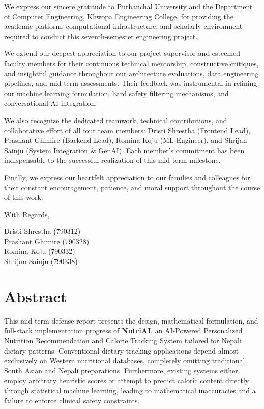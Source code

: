 \documentclass[12pt,a4paper]{report}
\begin{document}
We express our sincere gratitude to Purbanchal University and the Department of Computer Engineering, Khwopa Engineering College, for providing the academic platform, computational infrastructure, and scholarly environment required to conduct this seventh-semester engineering project.

We extend our deepest appreciation to our project supervisor and esteemed faculty members for their continuous technical mentorship, constructive critiques, and insightful guidance throughout our architecture evaluations, data engineering pipelines, and mid-term assessments. Their feedback was instrumental in refining our machine learning formulation, hard safety filtering mechanisms, and conversational AI integration.

We also recognize the dedicated teamwork, technical contributions, and collaborative effort of all four team members: Dristi Shrestha (Frontend Lead), Prashant Ghimire (Backend Lead), Romina Koju (ML Engineer), and Shrijan Sainju (System Integration \& GenAI). Each member's commitment has been indispensable to the successful realization of this mid-term milestone.

Finally, we express our heartfelt appreciation to our families and colleagues for their constant encouragement, patience, and moral support throughout the course of this work.

\vspace{0.8cm}
\noindent With Regards,

\vspace{0.5cm}
\noindent Dristi Shrestha \hfill (790312)\\[0.1cm]
\noindent Prashant Ghimire \hfill (790328)\\[0.1cm]
\noindent Romina Koju \hfill (790332)\\[0.1cm]
\noindent Shrijan Sainju \hfill (790338)

\newpage

\chapter*{Abstract}
\thispagestyle{plain}

This mid-term defense report presents the design, mathematical formulation, and full-stack implementation progress of \textbf{NutriAI}, an AI-Powered Personalized Nutrition Recommendation and Calorie Tracking System tailored for Nepali dietary patterns. Conventional dietary tracking applications depend almost exclusively on Western nutritional databases, completely omitting traditional South Asian and Nepali preparations. Furthermore, existing systems either employ arbitrary heuristic scores or attempt to predict caloric content directly through statistical machine learning, leading to mathematical inaccuracies and a failure to enforce clinical safety constraints.
\end{document}
